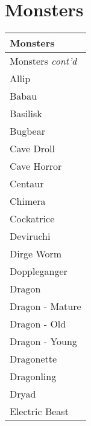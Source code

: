 \documentclass[twoside]{book}
\begin{document}
    

\section{Monsters}
    
\begin{longtable}{p{1.25in}} 
  Monsters
  \\
  \hline
  \hline
  \endfirsthead
  Monsters \textit{cont'd}
        
  \\
  \hline
  \endhead
      
  \raggedright
           Allip 
  \tabularnewline
      
  \raggedright
           Babau 
  \tabularnewline
      
  \raggedright
           Basilisk 
  \tabularnewline
      
  \raggedright
           Bugbear 
  \tabularnewline
      
  \raggedright
           Cave Droll 
  \tabularnewline
      
  \raggedright
           Cave Horror 
  \tabularnewline
      
  \raggedright
           Centaur 
  \tabularnewline
      
  \raggedright
           Chimera 
  \tabularnewline
      
  \raggedright
           Cockatrice 
  \tabularnewline
      
  \raggedright
           Deviruchi 
  \tabularnewline
      
  \raggedright
           Dirge Worm 
  \tabularnewline
      
  \raggedright
           Doppleganger 
  \tabularnewline
      
  \raggedright
           Dragon 
  \tabularnewline
      
  \raggedright
           Dragon - Mature 
  \tabularnewline
      
  \raggedright
           Dragon - Old 
  \tabularnewline
      
  \raggedright
           Dragon - Young 
  \tabularnewline
      
  \raggedright
           Dragonette 
  \tabularnewline
      
  \raggedright
           Dragonling 
  \tabularnewline
      
  \raggedright
           Dryad 
  \tabularnewline
      
  \raggedright
           Electric Beast 
  \tabularnewline
      

\end{longtable}
\end{document}
